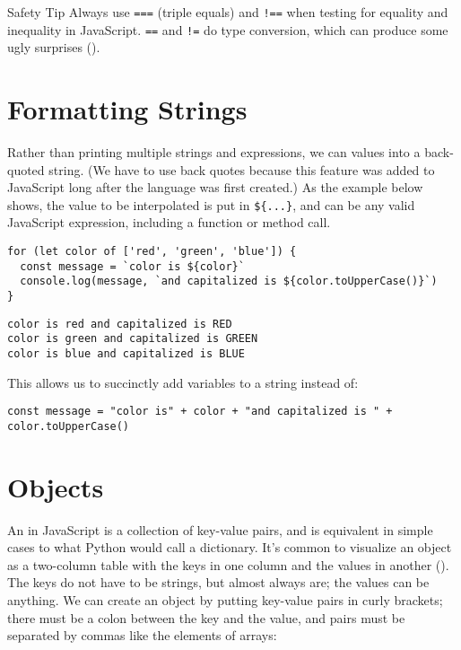 \begin{aside}{Safety Tip}
  Always use \texttt{===} (triple equals) and \texttt{!==}
  when testing for equality and inequality in JavaScript.
  \texttt{==} and \texttt{!=} do type conversion,
  which can produce some ugly surprises ().
\end{aside}

\section{Formatting Strings}\label{s:basics-formatting}

Rather than printing multiple strings and expressions,
we can 
values into a back-quoted string.
(We have to use back quotes because this feature was added to JavaScript
long after the language was first created.)
As the example below shows,
the value to be interpolated is put in \texttt{\$\{...\}},
and can be any valid JavaScript expression,
including a function or method call.

\begin{verbatim}
for (let color of ['red', 'green', 'blue']) {
  const message = `color is ${color}`
  console.log(message, `and capitalized is ${color.toUpperCase()}`)
}
\end{verbatim}

\begin{verbatim}
color is red and capitalized is RED
color is green and capitalized is GREEN
color is blue and capitalized is BLUE
\end{verbatim}

\noindent
This allows us to succinctly add variables to a string instead of:

\begin{verbatim}
const message = "color is" + color + "and capitalized is " + color.toUpperCase()
\end{verbatim}

\section{Objects}\label{s:basics-objects}

An  in JavaScript is a collection of key-value pairs,
and is equivalent in simple cases to what Python would call a dictionary.
It's common to visualize an object as a two-column table
with the keys in one column and the values in another ().
The keys do not have to be strings,
but almost always are;
the values can be anything.
We can create an object by putting key-value pairs in curly brackets;
there must be a colon between the key and the value,
and pairs must be separated by commas like the elements of arrays:

